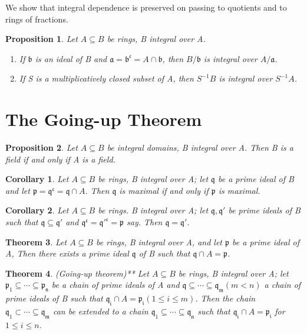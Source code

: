 \documentclass[]{report}
\newtheorem{theorem}{Theorem}[section]
\newtheorem{prop}[theorem]{Proposition}
\newtheorem{corollary}{Corollary}[theorem]
\begin{document}
We show that integral dependence is preserved on passing to quotients and to rings of fractions. 

\begin{prop}
    Let $A\subseteq B$ be rings, B integral over A.
    \begin{enumerate}
        \item If $\mathfrak{b}$ is an ideal of B and $\mathfrak{a = b^c} = A \cap \mathfrak{b}$, then $B/\mathfrak{b}$ is integral over $A/\mathfrak{a}$. 
        \item If S is a multiplicatively closed subset of A, then $S^{-1}B$ is integral over $S^{-1}A$.
    \end{enumerate}
\end{prop}

\section{The Going-up Theorem}

\begin{prop}
    Let $A\subseteq B$ be integral domains, B integral over A. Then B is a field if and only if A is a field. 
\end{prop}

\begin{corollary}
    Let $A\subseteq B$ be rings, B integral over A; let $\mathfrak{q}$ be a prime ideal of B and let $\mathfrak{p=q^c=q}\cap A$. Then $\mathfrak{q}$ is maximal if and only if $\mathfrak{p}$ is maximal. 
\end{corollary}

\begin{corollary}
    Let $A\subseteq B$ be rings. B integral over A; let $\mathfrak{q,q'}$ be prime ideals of B such that $\mathfrak{q\subseteq q'}$ and $\mathfrak{q^c = q'^{c} = p}$ say. Then $\mathfrak{q=q'}$.
\end{corollary}

\begin{theorem} 
    Let $A\subseteq B$ be rings, B integral over A, and let $\mathfrak{p}$ be a prime ideal of A, Then there exists a prime ideal $\mathfrak{q}$ of B such that $\mathfrak{q}\cap A = \mathfrak{p}$. 
\end{theorem}

\begin{theorem}
    (Going-up theorem)** Let $A\subseteq B$ be rings, B integral over A; let $\mathfrak{p_1 \subseteq \cdots \subseteq p_n}$ be a chain of prime ideals of A and $\mathfrak{q\subseteq \cdots \subseteq q_m} (m < n )$ a chain of prime ideals of B such that $\mathfrak{q_i}\cap A = \mathfrak{p_i} (1\leq i\leq m)$. Then the chain $\mathfrak{q_1\subset \cdots \subseteq q_m}$ can be extended to a chain $\mathfrak{q_1 \subseteq \cdots \subseteq q_n}$ such that $\mathfrak{q_i}\cap A = \mathfrak{p_i}$ for $1\leq i \leq n$.
\end{theorem}
\end{document}
